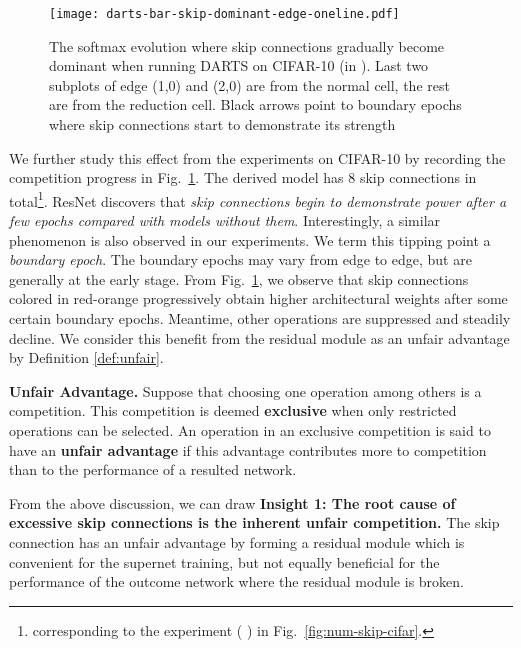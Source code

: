 \documentclass[runningheads]{llncs}
\begin{document}
\begin{figure}[ht]
	\centering
	\texttt{[image: darts-bar-skip-dominant-edge-oneline.pdf]}
\caption{The softmax evolution where skip connections gradually become dominant when running DARTS on CIFAR-10 (in ).  Last two subplots of edge (1,0) and (2,0) are from the normal cell, the rest are from the reduction cell. Black arrows point to boundary epochs where skip connections start to demonstrate its strength}
	\label{fig:darts-bar-skip-dominant-edge}
\end{figure}

We further study this effect from the experiments on CIFAR-10 by recording the competition progress in Fig.~\ref{fig:darts-bar-skip-dominant-edge}. The derived model has 8 skip connections in total\footnote{corresponding to the experiment ( ) in Fig.~\ref{fig:num-skip-cifar}.}. ResNet \cite{he2016deep} discovers that \emph{skip connections begin to demonstrate power after a few epochs compared with models without them}. Interestingly, a similar phenomenon  is also observed in our experiments. We term this tipping point a \emph{boundary epoch}. The boundary epochs may vary from edge to edge, but are generally at the early stage. From Fig.~\ref{fig:darts-bar-skip-dominant-edge}, we observe that skip connections colored in red-orange progressively obtain higher architectural weights after some certain boundary epochs. Meantime, other operations are suppressed and steadily decline. We consider this benefit from the residual module as an unfair advantage by Definition \ref{def:unfair}.

\begin{definition}
	\label{def:unfair}
	\textbf{Unfair Advantage.}  Suppose that choosing one operation among others is a competition. This competition is deemed \textbf{exclusive} when only restricted operations  can be selected. An operation in an exclusive competition is said to have an \textbf{unfair advantage} if this advantage contributes more to competition than to the performance of a resulted network.
\end{definition}

From the above discussion, we can draw 
\textbf{Insight 1: The root cause of excessive skip connections is the inherent unfair competition.} The skip connection has an unfair advantage by forming a residual module which is convenient for the supernet training, but not equally beneficial for the performance of the outcome network where the residual module is broken.
\end{document}
